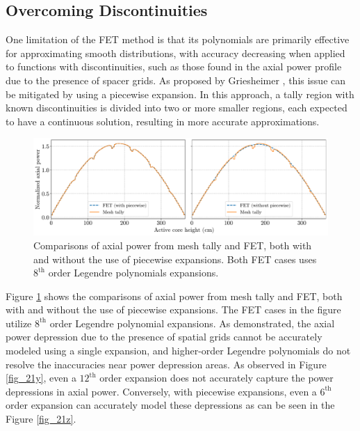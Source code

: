 \subsection{Overcoming Discontinuities} \label{sec22x}
One limitation of the FET method is that its polynomials are primarily effective for approximating smooth distributions, with accuracy decreasing when applied to functions with discontinuities, such as those found in the axial power profile due to the presence of spacer grids. As proposed by Griesheimer \cite{gries}, this issue can be mitigated by using a piecewise expansion. In this approach, a tally region with known discontinuities is divided into two or more smaller regions, each expected to have a continuous solution, resulting in more accurate approximations.

\begin{figure}
    \centering
    \includegraphics[width=1.0\textwidth]{figs/axi_pow_comparison.pdf}
    \caption[Comparisons of axial power from mesh tally and FET.]{Comparisons of axial power from mesh tally and FET, both with and without the use of piecewise expansions. Both FET cases uses $8^\text{th}$ order Legendre polynomials expansions.}
    \label{fig_21x}
\end{figure}

Figure \ref{fig_21x} shows the comparisons of axial power from mesh tally and FET, both with and without the use of piecewise expansions. The FET cases in the figure utilize $8^\text{th}$ order Legendre polynomial expansions. As demonstrated, the axial power depression due to the presence of spatial grids cannot be accurately modeled using a single expansion, and higher-order Legendre polynomials do not resolve the inaccuracies near power depression areas. As observed in Figure \ref{fig_21y}, even a $12^\text{th}$ order expansion does not accurately capture the power depressions in axial power. Conversely, with piecewise expansions, even a $6^\text{th}$ order expansion can accurately model these depressions as can be seen in the Figure \ref{fig_21z}.

